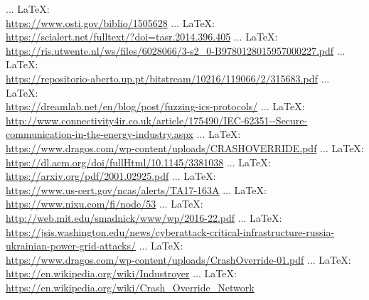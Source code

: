 \begin{thebibliography}{99}
{{{			 ... \LaTeX:\\ \url{https://www.osti.gov/biblio/1505628}
			 ... \LaTeX:\\ \url{https://scialert.net/fulltext/?doi=tasr.2014.396.405}
			 ... \LaTeX:\\ \url{https://ris.utwente.nl/ws/files/6028066/3-s2_0-B9780128015957000227.pdf}
			 ... \LaTeX:\\ \url{https://repositorio-aberto.up.pt/bitstream/10216/119066/2/315683.pdf}
			 ... \LaTeX:\\ \url{https://dreamlab.net/en/blog/post/fuzzing-ics-protocols/}
			 ... \LaTeX:\\ \url{http://www.connectivity4ir.co.uk/article/175490/IEC-62351--Secure-communication-in-the-energy-industry.aspx}
			 ... \LaTeX:\\ \url{https://www.dragos.com/wp-content/uploads/CRASHOVERRIDE.pdf}
			 ... \LaTeX:\\ \url{https://dl.acm.org/doi/fullHtml/10.1145/3381038}
			 ... \LaTeX:\\ \url{https://arxiv.org/pdf/2001.02925.pdf}
			 ... \LaTeX:\\ \url{https://www.us-cert.gov/ncas/alerts/TA17-163A}
			 ... \LaTeX:\\ \url{https://www.nixu.com/fi/node/53}
			 ... \LaTeX:\\ \url{http://web.mit.edu/smadnick/www/wp/2016-22.pdf}
			 ... \LaTeX:\\ \url{https://jsis.washington.edu/news/cyberattack-critical-infrastructure-russia-ukrainian-power-grid-attacks/}
			 ... \LaTeX:\\ \url{https://www.dragos.com/wp-content/uploads/CrashOverride-01.pdf}
			 ... \LaTeX:\\ \url{https://en.wikipedia.org/wiki/Industroyer}
			 ... \LaTeX:\\ \url{https://en.wikipedia.org/wiki/Crash_Override_Network}
}}}
\end{thebibliography}

